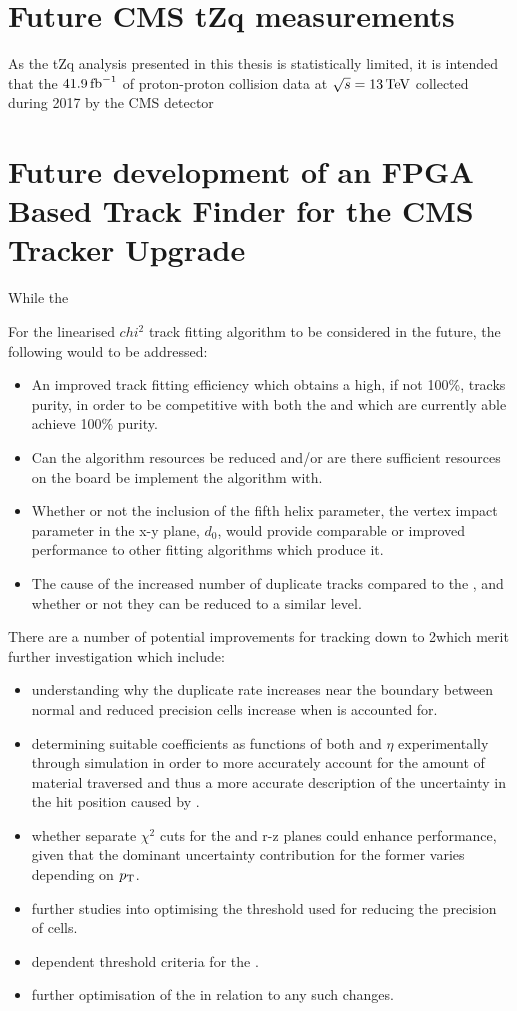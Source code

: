 \section{Future CMS tZq measurements}
As the tZq analysis presented in this thesis is statistically limited, it is intended that the $41.9\mbox{\ensuremath{\,\text{fb}^\text{$-$1}}}$ of proton-proton collision data at $\sqrt{s} = 13\,\text{Te\hspace{-.08em}V}$ collected during 2017 by the CMS detector

\section{Future development of an FPGA Based Track Finder for the CMS Tracker Upgrade}
While the 

For the linearised $chi^{2}$ track fitting algorithm to be considered in the future, the following would to be addressed:
\begin{itemize}
\item An improved track fitting efficiency which obtains a high, if not 100\%, tracks purity, in order to be competitive with both the \KF and \LR which are currently able achieve 100\% purity.
\item Can the algorithm resources be reduced and/or are there sufficient resources on the board be implement the algorithm with.
\item Whether or not the inclusion of the fifth helix parameter, the vertex impact parameter in the x-y plane, $d_{0}$, would provide comparable or improved performance to other fitting algorithms which produce it.
\item The cause of the increased number of duplicate tracks compared to the \KF, and whether or not they can be reduced to a similar level.
\end{itemize}

There are a number of potential improvements for tracking down to 2\GeV which merit further investigation which include:
\begin{itemize}
\item understanding why the duplicate rate increases near the boundary between normal and reduced precision \HT cells increase when \MS is accounted for.
\item determining suitable coefficients as functions of both \pT and $\eta$ experimentally through simulation in order to more accurately account for the amount of material traversed and thus a more accurate description of the uncertainty in the hit position caused by \MS.
\item whether separate \KF $\chi^{2}$ cuts for the \rphi and r-z planes could enhance performance, given that the dominant uncertainty contribution for the former varies depending on $p_{\mathrm{T}}$.
\item further studies into optimising the \pT threshold used for reducing the precision of \HT cells.
\item \pt dependent threshold criteria for the \HT.
\item further optimisation of the \KF in relation to any such changes.
\end{itemize}
